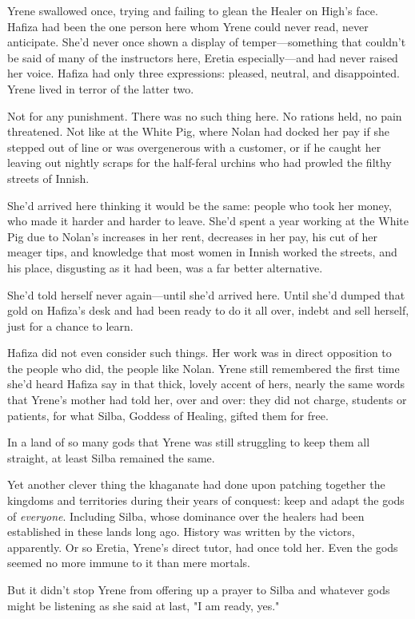 Yrene swallowed once, trying and failing to glean the Healer on High's face.
Hafiza had been the one person here whom Yrene could never read, never anticipate.
She'd never once shown a display of temper---something that couldn't be said of many of the instructors here, Eretia especially---and had never raised her voice.
Hafiza had only three expressions: pleased, neutral, and disappointed.
Yrene lived in terror of the latter two.

Not for any punishment.
There was no such thing here.
No rations held, no pain threatened.
Not like at the White Pig, where Nolan had docked her pay if she stepped out of line or was overgenerous with a customer, or if he caught her leaving out nightly scraps for the half-feral urchins who had prowled the filthy streets of Innish.

She'd arrived here thinking it would be the same: people who took her money, who made it harder and harder to leave.
She'd spent a year working at the White Pig due to Nolan's increases in her rent, decreases in her pay, his cut of her meager tips, and knowledge that most women in Innish worked the streets, and his place, disgusting as it had been, was a far better alternative.

She'd told herself never again---until she'd arrived here.
Until she'd dumped that gold on Hafiza's desk and had been ready to do it all over, indebt and sell herself, just for a chance to learn.

Hafiza did not even consider such things.
Her work was in direct opposition to the people who did, the people like Nolan.
Yrene still remembered the first time she'd heard Hafiza say in that thick, lovely accent of hers, nearly the same words that Yrene's mother had told her, over and over: they did not charge, students or patients, for what Silba, Goddess of Healing, gifted them for free.

In a land of so many gods that Yrene was still struggling to keep them all straight, at least Silba remained the same.

Yet another clever thing the khaganate had done upon patching together the kingdoms and territories during their years of conquest: keep and adapt the gods of \emph{everyone}.
Including Silba, whose dominance over the healers had been established in these lands long ago.
History was written by the victors, apparently.
Or so Eretia, Yrene's direct tutor, had once told her.
Even the gods seemed no more immune to it than mere mortals.

But it didn't stop Yrene from offering up a prayer to Silba and whatever gods might be listening as she said at last, "I am ready, yes."

